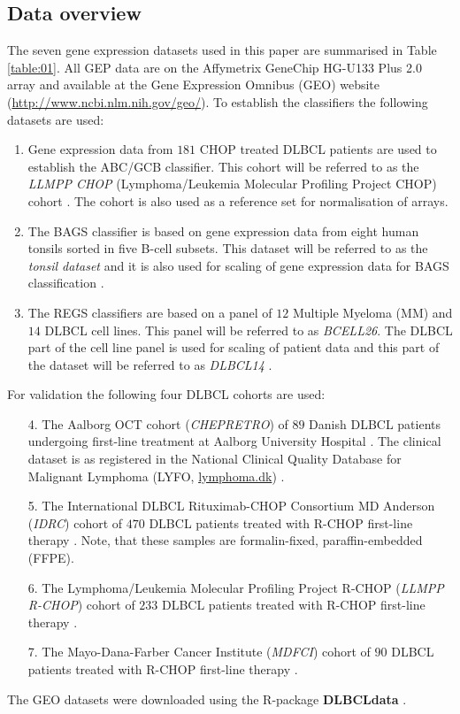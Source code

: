 \documentclass[twocolumn]{bmcart}%
\newcommand{\R}{\textsf{R}}
\newcommand{\pkg}[1]{\textbf{#1}}
\begin{document}
\subsection{Data overview}
The seven gene expression datasets used in this paper are summarised in Table \ref{table:01}.
All GEP data are on the Affymetrix GeneChip HG-U133 Plus 2.0 array and available at the Gene Expression Omnibus (GEO) \cite{Barrett2013} website (\url{http://www.ncbi.nlm.nih.gov/geo/}).
To establish the classifiers the following datasets are used:
\begin{enumerate}
  \item Gene expression data from $181$ CHOP treated DLBCL patients are used to establish the ABC/GCB classifier.
  This cohort will be referred to as the \emph{LLMPP CHOP} (Lymphoma/Leukemia Molecular Profiling Project CHOP) cohort \cite{Lenz2008a}.
  The cohort is also used as a reference set for normalisation of arrays.
  \item The BAGS classifier is based on gene expression data from eight human tonsils sorted in five B-cell subsets.
  This dataset will be referred to as the \emph{tonsil dataset} and it is also used for scaling of gene expression data for BAGS classification \cite{DybkaerBoegsted2015}.
  \item The REGS classifiers are based on a panel of $12$ Multiple Myeloma (MM) and $14$ DLBCL cell lines.
  This panel will be referred to as \emph{BCELL26}.
  The DLBCL part of the cell line panel is used for scaling of patient data and this part of the dataset will be referred to as   \emph{DLBCL14} \cite{Falgreen2015}.
\end{enumerate}
For validation the following four DLBCL cohorts are used:
\begin{enumerate}
  \item[4.] The Aalborg OCT cohort (\emph{CHEPRETRO}) of $89$ Danish DLBCL patients undergoing first-line treatment at Aalborg University Hospital \cite{DybkaerBoegsted2015}.
  The clinical dataset is as registered in the National Clinical Quality Database for Malignant Lymphoma (LYFO, \url{lymphoma.dk}) \cite{Gang2012}.
  \item[5.] The International DLBCL Rituximab-CHOP Consortium MD Anderson (\emph{IDRC}) cohort of $470$ DLBCL patients treated with R-CHOP first-line therapy \cite{Visco2012}.
  Note, that these samples are formalin-fixed, paraffin-embedded (FFPE).
  \item[6.] The Lymphoma/Leukemia Molecular Profiling Project R-CHOP (\emph{LLMPP R-CHOP}) cohort of $233$ DLBCL patients treated with R-CHOP first-line therapy \cite{Lenz2008a}.
  \item[7.] The Mayo-Dana-Farber Cancer Institute (\emph{MDFCI}) cohort of $90$ DLBCL patients treated with R-CHOP first-line therapy \cite{Monti2012a}.
\end{enumerate}
The GEO datasets were downloaded using the \R{}-package \pkg{DLBCLdata} \cite{DLBCLdata}.
\end{document}
